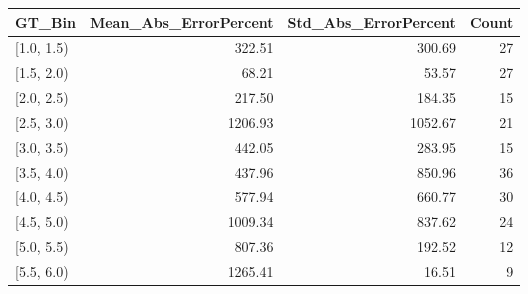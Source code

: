 \begin{tabular}{lrrr}
\toprule
GT_Bin & Mean_Abs_ErrorPercent & Std_Abs_ErrorPercent & Count \\
\midrule
[1.0, 1.5) & 322.51 & 300.69 & 27 \\
[1.5, 2.0) & 68.21 & 53.57 & 27 \\
[2.0, 2.5) & 217.50 & 184.35 & 15 \\
[2.5, 3.0) & 1206.93 & 1052.67 & 21 \\
[3.0, 3.5) & 442.05 & 283.95 & 15 \\
[3.5, 4.0) & 437.96 & 850.96 & 36 \\
[4.0, 4.5) & 577.94 & 660.77 & 30 \\
[4.5, 5.0) & 1009.34 & 837.62 & 24 \\
[5.0, 5.5) & 807.36 & 192.52 & 12 \\
[5.5, 6.0) & 1265.41 & 16.51 & 9 \\
\bottomrule
\end{tabular}
